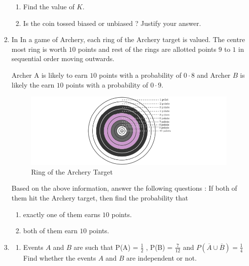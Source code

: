 \begin{enumerate}[label=\thesection.\arabic*.,ref=\thesection.\theenumi]
    \begin{enumerate}[label=(\alph*)]
    
 \item  Find the value of $K$. 
 
 \item  Is the coin tossed biased or unbiased ? Justify your answer.

\end{enumerate}

\item In  In a game of Archery, each ring of the Archery target is valued. The 
centre most ring is worth $10$ points and rest of the rings are allotted 
points $9$ to $1$ in sequential order moving outwards.

Archer A is likely to earn $10$ points with a probability of $0·8$ and Archer $B$ 
is likely the earn $10$ points with a probability of $0·9$.

\begin{figure}[H]
        \centering
        \includegraphics[width=\columnwidth]{./figs/Screenshot (26).png}
        \caption{Ring of the Archery Target}
        \label{fig:fig4.png}
    \end{figure}

Based on the above information, answer the following questions : 
If both of them hit the Archery target, then find the probability that 

\begin{enumerate}[label=(\alph*)]
    
 \item  exactly one of them earns $10$ points.
 
 \item  both of them earn $10$ points.

\end{enumerate}


\item 
\begin{enumerate}[label=(\alph*)]
    
 \item  Events $A$ and $B$ are such that
 P(A) =  $\frac{1}{2}$ , P(B) =  $\frac{7}{12}$  and $ P( \overline{A}  \cup  \overline{B} )= \frac{1}{4}$ Find whether the events $A$ and $B$ are independent or not.
 

\end{enumerate}
\end{enumerate}
